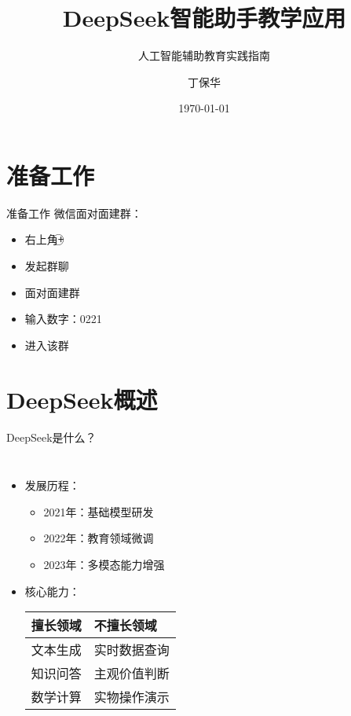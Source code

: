 \documentclass{ctexbeamer}
\title{DeepSeek智能助手教学应用}
\subtitle{人工智能辅助教育实践指南}
\author{丁保华}
\institute{致慧星空工作室}
\date{\today}
\begin{document}
\maketitle

\section{准备工作}
\begin{frame}[t]{准备工作}
微信面对面建群：\\
\begin{itemize}
\item 右上角\textcircled{+}
\item 发起群聊
\item 面对面建群
\item 输入数字：\alert{0221}
\item 进入该群
\end{itemize}
\end{frame}

\section{DeepSeek概述}
\begin{frame}{DeepSeek是什么？}
  \begin{columns}
    \begin{itemize}
      \item 发展历程：
        \begin{itemize}
          \item 2021年：基础模型研发
          \item 2022年：教育领域微调
          \item 2023年：多模态能力增强
        \end{itemize}
      \item 核心能力：
        \begin{tabular}{ll}
          \toprule
          擅长领域 & 不擅长领域 \\
          \midrule
          文本生成 & 实时数据查询 \\
          知识问答 & 主观价值判断 \\
          数学计算 & 实物操作演示 \\
          \bottomrule
        \end{tabular}
    \end{itemize}

  \end{columns}
\end{frame}
\end{document}
